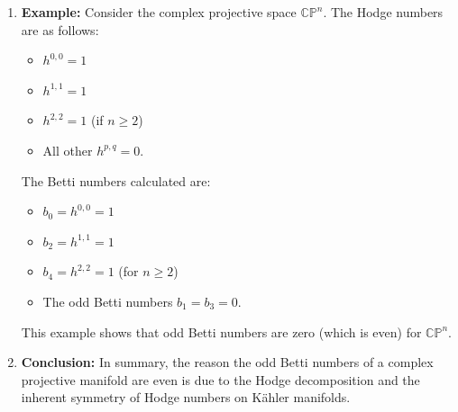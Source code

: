 \documentclass[lang=en,12pt]{beautybook}
\begin{document}
\begin{enumerate}
  \item \textbf{Example:}
        Consider the complex projective space $\mathbb{CP}^n$. The Hodge numbers are as follows:
        \begin{itemize}
          \item $h^{0,0} = 1$
          \item $h^{1,1} = 1$
          \item $h^{2,2} = 1$ (if $n \geq 2$)
          \item All other $h^{p,q} = 0$.
        \end{itemize}

        The Betti numbers calculated are:
        \begin{itemize}
          \item $b_0 = h^{0,0} = 1$
          \item $b_2 = h^{1,1} = 1$
          \item $b_4 = h^{2,2} = 1$ (for $n \geq 2$)
          \item The odd Betti numbers $b_1 = b_3 = 0$.
        \end{itemize}

        This example shows that odd Betti numbers are zero (which is even) for $\mathbb{CP}^n$.

  \item \textbf{Conclusion:}
        In summary, the reason the odd Betti numbers of a complex projective manifold are even is due to the Hodge decomposition and the inherent symmetry of Hodge numbers on Kähler manifolds.
\end{enumerate}
\end{document}
